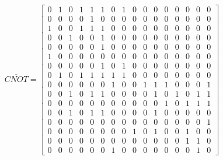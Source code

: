 \documentclass[12pt, a4paper]{report}
\begin{document}
\begin{appendices}
\begin{equation}
\label{mat:Logical CNOT}
\bar{CNOT}=
    \begin{bmatrix}
    0 & 1 & 0 & 1 & 1 & 1 & 0 & 1 & 0 & 0 & 0 & 0 & 0 & 0 & 0 & 0 \\
    0 & 0 & 0 & 0 & 1 & 0 & 0 & 0 & 0 & 0 & 0 & 0 & 0 & 0 & 0 & 0 \\
    1 & 0 & 0 & 1 & 1 & 1 & 0 & 0 & 0 & 0 & 0 & 0 & 0 & 0 & 0 & 0 \\
    0 & 0 & 1 & 0 & 0 & 1 & 0 & 0 & 0 & 0 & 0 & 0 & 0 & 0 & 0 & 0 \\
    0 & 0 & 0 & 0 & 0 & 1 & 0 & 0 & 0 & 0 & 0 & 0 & 0 & 0 & 0 & 0 \\
    1 & 0 & 0 & 0 & 0 & 0 & 0 & 0 & 0 & 0 & 0 & 0 & 0 & 0 & 0 & 0 \\
    0 & 0 & 0 & 0 & 0 & 1 & 0 & 1 & 0 & 0 & 0 & 0 & 0 & 0 & 0 & 0 \\
    0 & 1 & 0 & 1 & 1 & 1 & 1 & 1 & 0 & 0 & 0 & 0 & 0 & 0 & 0 & 0 \\
    0 & 0 & 0 & 0 & 0 & 0 & 1 & 0 & 0 & 1 & 1 & 1 & 0 & 0 & 0 & 1 \\
    0 & 0 & 1 & 0 & 1 & 1 & 0 & 0 & 0 & 0 & 1 & 0 & 1 & 0 & 1 & 1 \\
    0 & 0 & 0 & 0 & 0 & 0 & 0 & 0 & 0 & 0 & 0 & 1 & 0 & 1 & 1 & 1 \\
    0 & 0 & 1 & 0 & 1 & 1 & 0 & 0 & 0 & 0 & 1 & 0 & 0 & 0 & 0 & 0 \\
    0 & 0 & 0 & 0 & 0 & 0 & 0 & 0 & 0 & 0 & 0 & 0 & 0 & 0 & 0 & 1 \\
    0 & 0 & 0 & 0 & 0 & 0 & 0 & 0 & 1 & 0 & 1 & 0 & 0 & 1 & 0 & 0 \\
    0 & 0 & 0 & 0 & 0 & 0 & 0 & 0 & 0 & 0 & 0 & 0 & 0 & 1 & 1 & 0 \\
    0 & 0 & 0 & 0 & 0 & 0 & 1 & 0 & 0 & 0 & 0 & 0 & 0 & 0 & 1 & 0
    \end{bmatrix}
\end{equation}



\end{appendices}
\clearpage
\printglossaries

\end{document}
